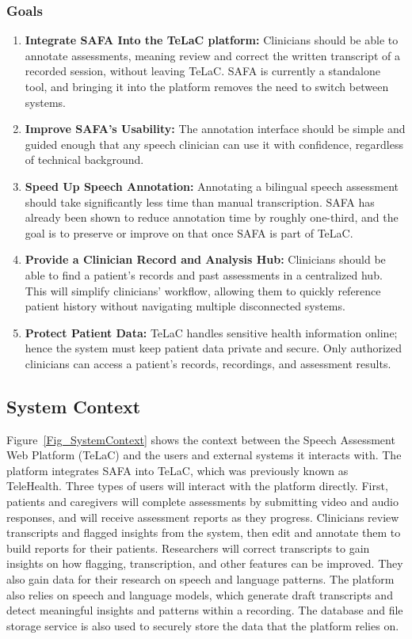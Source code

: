 \documentclass[12pt]{article}
\begin{document}
\subsubsection{Goals} \label{sec:Goals}
\begin{enumerate}
    \item \textbf{Integrate SAFA Into the TeLaC platform: }Clinicians should be able to annotate assessments, meaning review and correct the written transcript of a recorded session, without leaving TeLaC. SAFA is currently a standalone tool, and bringing it into the platform removes the need to switch between systems.
    \item \textbf{Improve SAFA’s Usability: }The annotation interface should be simple and guided enough that any speech clinician can use it with confidence, regardless of technical background.
    \item \textbf{Speed Up Speech Annotation: }Annotating a bilingual speech assessment should take significantly less time than manual transcription. SAFA has already been shown to reduce annotation time by roughly one-third, and the goal is to preserve or improve on that once SAFA is part of TeLaC.
    \item \textbf{Provide a Clinician Record and Analysis Hub: }Clinicians should be able to find a patient’s records and past assessments in a centralized hub. This will simplify clinicians’ workflow, allowing them to quickly reference patient history without navigating multiple disconnected systems.
    \item \textbf{Protect Patient Data: }TeLaC handles sensitive health information online; hence the system must keep patient data private and secure. Only authorized clinicians can access a patient’s records, recordings, and assessment results.
\end{enumerate}


  
\subsection{System Context}

Figure~\ref{Fig_SystemContext} shows the context between the Speech Assessment
Web Platform (TeLaC) and the users and external systems it interacts with. The platform
integrates SAFA into TeLaC, which was previously known as TeleHealth. Three types
of users will interact with the platform directly. First, patients and caregivers will
complete assessments by submitting video and audio responses, and will receive
assessment reports as they progress. Clinicians review transcripts 
and flagged insights from the system, then edit and annotate them to build reports for 
their patients. Researchers will correct transcripts to gain insights on how flagging,
transcription, and other features can be improved. They also gain data for their research
on speech and language patterns.
The platform also relies on speech and language models, which generate draft transcripts
and detect meaningful insights and patterns within a recording. The database and 
file storage service is also used to securely store the data that the platform relies on.
\end{document}
